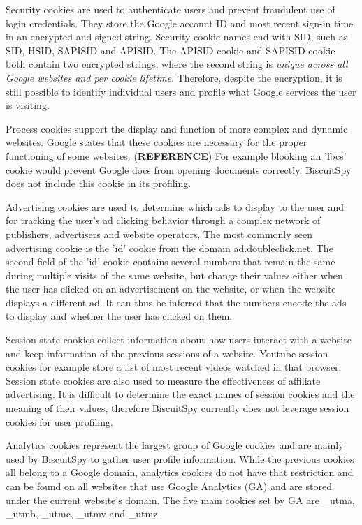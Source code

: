 Security cookies are used to authenticate users and prevent fraudulent use of login credentials. They store the Google account ID and most recent sign-in time in an encrypted and signed string. Security cookie names end with SID, such as SID, HSID, SAPISID and APISID. The APISID cookie and SAPISID cookie both contain two encrypted strings, where the second string is \emph{unique across all Google websites and per cookie lifetime}. Therefore, despite the encryption, it is still possible to identify individual users and profile what Google services the user is visiting.

Process cookies support the display and function of more complex and dynamic websites. Google states that these cookies are necessary for the proper functioning of some websites. (\textbf{REFERENCE}) For example blooking an 'lbcs' cookie would prevent Google docs from opening documents correctly. BiscuitSpy does not include this cookie in its profiling.

Advertising cookies are used to determine which ads to display to the user and for tracking the user's ad clicking behavior through a complex network of publishers, advertisers and website operators. The most commonly seen advertising cookie is the 'id' cookie from the domain ad.doubleclick.net. The second field of the 'id' cookie contains several numbers that remain the same during multiple visits of the same website, but change their values either when the user has clicked on an advertisement on the website, or when the website displays a different ad. It can thus be inferred that the numbers encode the ads to display and whether the user has clicked on them.

Session state cookies collect information about how users interact with a website and keep information of the previous sessions of a website. Youtube session cookies for example store a list of most recent videos watched in that browser. Session state cookies are also used to measure the effectiveness of affiliate advertising. It is difficult to determine the exact names of session cookies and the meaning of their values, therefore BiscuitSpy currently does not leverage session cookies for user profiling.

Analytics cookies represent the largest group of Google cookies and are mainly used by BiscuitSpy to gather user profile information. While the previous cookies all belong to a Google domain, analytics cookies do not have that restriction and can be found on all websites that use Google Analytics (GA) and are stored under the current website's domain. The five main cookies set by GA are  \_utma,  \_utmb, \_utmc, \_utmv and \_utmz. 

